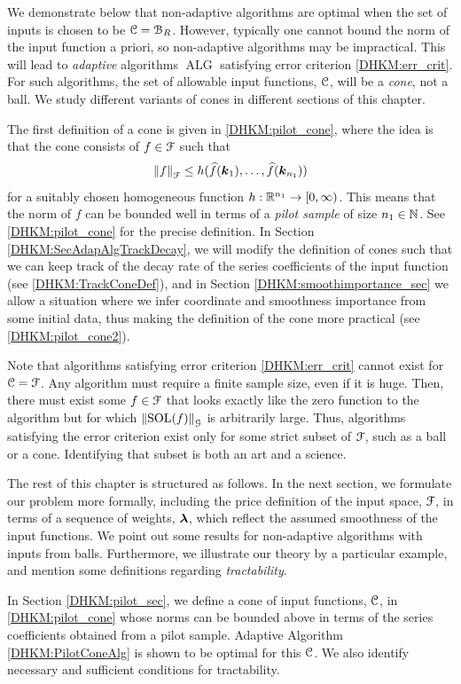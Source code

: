 \documentclass[USenglish]{article}
\theoremstyle{dgthm}
\theoremstyle{dgthm}
\theoremstyle{dgthm}
\theoremstyle{dgthm}
\theoremstyle{dgdef}
\theoremstyle{definition}
\DeclareMathOperator{\SOL}{SOL}
\DeclareMathOperator{\ALG}{ALG}
\newcommand{\hf}{\widehat{f}}
\newcommand{\norm}[2][{}]{\ensuremath{\left \lVert #2 \right \rVert}_{#1}}
\begin{document}
{We demonstrate below that non-adaptive algorithms are optimal when the set of inputs is chosen to be ${\mathcal{C}} = {\mathcal{B}}_R$. However, typically one cannot bound the norm of the input function a priori, so non-adaptive algorithms may be impractical. 
This will lead to \emph{adaptive} algorithms $\ALG$ satisfying error criterion \eqref{DHKM:err_crit}.  For such algorithms, the set of allowable input functions, ${\mathcal{C}}$, will be a \emph{cone}, not a ball. We study different variants of cones in different sections of this chapter. 

The first definition of a cone is given in \eqref{DHKM:pilot_cone}, 
where the idea is that the cone consists of $f\in{\mathcal{F}}$ such that 
$$
  \norm[\calF]{f}\le h (\hf(\bsk_1),\ldots,\hf (\bsk_{n_1}))
$$
for a suitably chosen homogeneous function $h:{\mathbb{R}}^{n_1}\rightarrow [0,\infty)$. This means that the norm of $f$ can be bounded well in terms of 
a \emph{pilot sample} of size $n_1\in{\mathbb{N}}$. See \eqref{DHKM:pilot_cone} for the precise definition. In Section \ref{DHKM:SecAdapAlgTrackDecay}, we will modify the definition of cones such that we can keep track of the decay rate of the series coefficients of the input function (see \eqref{DHKM:TrackConeDef}), 
and in Section \ref{DHKM:smoothimportance_sec} we allow a situation 
where we infer coordinate and smoothness importance from some initial data, thus making the definition of the cone more practical (see  
\eqref{DHKM:pilot_cone2}).

Note that algorithms satisfying error criterion \eqref{DHKM:err_crit} cannot exist for ${\mathcal{C}} = {\mathcal{F}}$. Any algorithm must require a finite sample size, even if it is huge.  Then, there must exist some $f \in {\mathcal{F}}$ that looks exactly like the zero function to the algorithm but for which $\norm[\calG]{\SOL(f)}$ is arbitrarily large.  Thus, algorithms satisfying the error criterion  exist only for some strict subset of ${\mathcal{F}}$, such as a ball or a cone.  Identifying that subset is both an art and a science.

The rest of this chapter is structured as follows. In the next section, we formulate our problem more formally, including the price definition of the input space, ${\mathcal{F}}$, in terms of a sequence of weights, ${\boldsymbol{\lambda}}$, which reflect the assumed smoothness of the input functions.  We point out some results for non-adaptive algorithms with inputs from balls. Furthermore, we illustrate our theory by 
a particular example, and mention some definitions regarding \emph{tractability}. 

In Section \ref{DHKM:pilot_sec}, we define a cone of input functions, ${\mathcal{C}}$, in \eqref{DHKM:pilot_cone} whose norms can be bounded above in terms of the series coefficients obtained from a pilot sample.  Adaptive Algorithm \ref{DHKM:PilotConeAlg} is shown to be optimal for this ${\mathcal{C}}$.  We also identify necessary and sufficient conditions for tractability.

}
\end{document}
